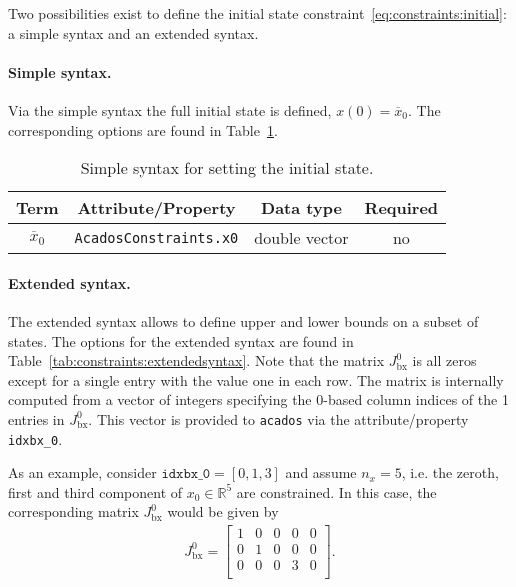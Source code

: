 \documentclass[english]{article}
\newcommand{\code}[1]{\texttt{#1}}
\newcommand{\acados}{\texttt{acados}}
\newcommand{\ind}[1]{_{\textrm{#1}}}
\newcommand{\initial}{^{\textrm{0}}}
\newcommand{\R}{\mathbb{R}}
\newcommand{\optional}{no}
\begin{document}
Two possibilities exist to define the initial state constraint~\eqref{eq:constraints:initial}: a simple syntax and an extended syntax.

\paragraph{Simple syntax.}
Via the simple syntax the full initial state is defined, $x(0)=\overline{x}_0$.
The corresponding options are found in Table~\ref{tab:constraints:simplesyntax}.
\begin{table}[ht!]
    \centering
    \begin{tabular}{cccc}
        \toprule
        Term & Attribute/Property & Data type & Required \\ \midrule
        $ \overline{x}_0 $ & \code{AcadosConstraints.x0} & double vector & \optional \\
        \bottomrule
    \end{tabular}
    \caption{Simple syntax for setting the initial state.} \label{tab:constraints:simplesyntax}
\end{table}
%
\paragraph{Extended syntax.}
The extended syntax allows to define upper and lower bounds on a subset of states.
The options for the extended syntax are found in Table~\ref{tab:constraints:extendedsyntax}.
Note that the matrix $J\ind{bx}\initial$ is all zeros except for a single entry with the value one in each row.
The matrix is internally computed from a vector of integers specifying the 0-based column indices of the 1 entries in $J\ind{bx}\initial$.
This vector is provided to \acados{} via the attribute/property \texttt{idxbx\_0}.

As an example, consider $\texttt{idxbx\_0} = [0, 1, 3]$ and assume $n_x = 5$, i.e. the zeroth, first and third component of $x_0 \in \R^5$ are constrained.
In this case, the corresponding matrix $J\ind{bx}\initial$ would be given by
\begin{align}
J\ind{bx}\initial = 
\begin{bmatrix}
1 & 0 & 0 & 0 & 0\\
0 & 1 & 0 & 0 & 0\\
0 & 0 & 0 & 3 & 0\\
\end{bmatrix}.
\end{align}
\end{document}
